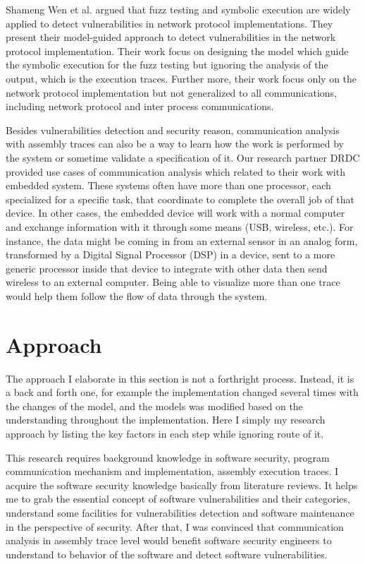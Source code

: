 Shameng Wen et al. argued that fuzz testing and symbolic execution are widely applied to detect vulnerabilities in network protocol implementations. They present their model-guided approach to detect vulnerabilities in the network protocol implementation. Their work focus on designing the model which guide the symbolic execution for the fuzz testing but ignoring the analysis of the output, which is the execution traces. \cite{wen2017model} Further more, their work focus only on the network protocol implementation but not generalized to all communications, including network protocol and inter process communications.

Besides vulnerabilities detection and security reason, communication analysis with assembly traces can also be a way to learn how the work is performed by the system or sometime validate a specification of it. Our research partner DRDC provided use cases of communication analysis which related to their work with embedded system. These systems often have more than one processor, each specialized for a specific task, that coordinate to complete the overall job of that device.  In other cases, the embedded device will work with a normal computer and exchange information with it through some means
(USB, wireless, etc.).  For instance, the data might be coming in from an external sensor in an analog form, transformed by a Digital Signal Processor (DSP) in a device, sent to a more generic processor inside that device to integrate with other data then send wireless to an external computer. Being able to visualize more than one trace would help them follow the flow of data through the system.

\section{Approach}
The approach I elaborate in this section is not a forthright process. Instead, it is a back and forth one, for example the implementation changed several times with the changes of the model, and the models was modified based on the understanding throughout the implementation. Here I simply my research approach by listing the key factors in each step while ignoring route of it.

This research requires background knowledge in software security, program communication mechanism and implementation, assembly execution traces. I acquire the software security knowledge basically from literature reviews. It helps me to grab the essential concept of software vulnerabilities and their categories, understand some facilities for vulnerabilities detection and software maintenance in the perspective of security. After that, I was convinced that communication analysis in assembly trace level would benefit software security engineers to understand to behavior of the software and detect software vulnerabilities. 

